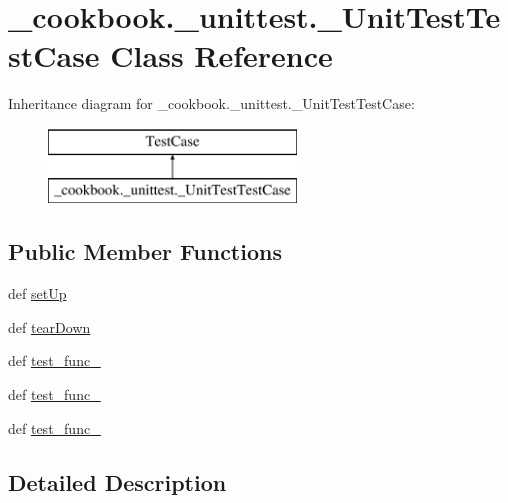 \hypertarget{class__cookbook_1_1__unittest_1_1__UnitTestTestCase}{\section{\-\_\-cookbook.\-\_\-unittest.\-\_\-\-Unit\-Test\-Test\-Case Class Reference}
\label{class__cookbook_1_1__unittest_1_1__UnitTestTestCase}
}
Inheritance diagram for \-\_\-cookbook.\-\_\-unittest.\-\_\-\-Unit\-Test\-Test\-Case\-:\begin{figure}[H]
\begin{center}
\leavevmode
\includegraphics[height=2.000000cm]{dd/dfd/class__cookbook_1_1__unittest_1_1__UnitTestTestCase}
\end{center}
\end{figure}
\subsection*{Public Member Functions}
\begin{DoxyCompactItemize}
\item 
def \hyperlink{class__cookbook_1_1__unittest_1_1__UnitTestTestCase_ad6b68e36d804273afb8eb2aa1b79ba74}{set\-Up}
\item 
def \hyperlink{class__cookbook_1_1__unittest_1_1__UnitTestTestCase_a91e1c0f3653bce92280320c4d31110cb}{tear\-Down}
\item 
def \hyperlink{class__cookbook_1_1__unittest_1_1__UnitTestTestCase_a18f8f6f8b79b5d074ad2e01ea4944707}{test\-\_\-func\-\_}
\item 
def \hyperlink{class__cookbook_1_1__unittest_1_1__UnitTestTestCase_a9a921e81044cde0239d1e5eaf43bbe9c}{test\-\_\-func\-\_}
\item 
def \hyperlink{class__cookbook_1_1__unittest_1_1__UnitTestTestCase_a970636078c93003962607406a22276e8}{test\-\_\-func\-\_}
\end{DoxyCompactItemize}


\subsection{Detailed Description}


